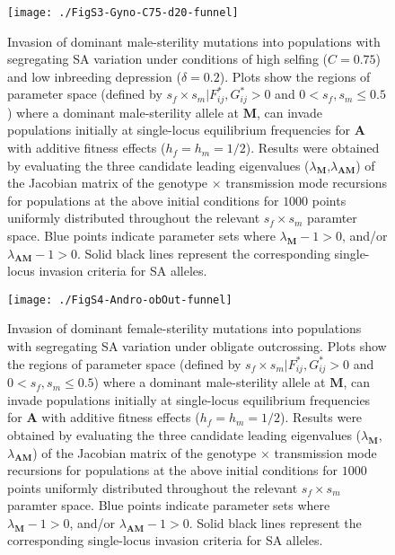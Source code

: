 \documentclass{article}
\begin{document}
\begin{figure}[ht!]
\centering
\texttt{[image: ./FigS3-Gyno-C75-d20-funnel]}
\caption{Invasion of dominant male-sterility mutations into populations with segregating SA variation under conditions of high selfing ($C = 0.75$) and low inbreeding depression ($\delta = 0.2$). Plots show the regions of parameter space (defined by $s_f \times s_m | F^{\ast}_{ij},G^{\ast}_{ij} > 0$ and $0 < s_f,s_m \leq 0.5$) where a dominant male-sterility allele at $\mathbf{M}$, can invade populations initially at single-locus equilibrium frequencies for $\mathbf{A}$ with additive fitness effects ($h_f=h_m=1/2$). Results were obtained by evaluating the three candidate leading eigenvalues ($\lambda_{\mathbf{M}}$,$\lambda_{\mathbf{AM}}$) of the Jacobian matrix of the genotype $\times$ transmission mode recursions for populations at the above initial conditions for $1000$ points uniformly distributed throughout the relevant $s_f \times s_m$ paramter space. Blue points indicate parameter sets where $\lambda_{\mathbf{M}} - 1 > 0$, and/or $\lambda_{\mathbf{AM}} - 1 > 0$. Solid black lines represent the corresponding single-locus invasion criteria for SA alleles.}
\label{fig:GynC75d20Funnel}
\end{figure}
\newpage{}

\begin{figure}[ht!]
\centering
\texttt{[image: ./FigS4-Andro-obOut-funnel]}
\caption{Invasion of dominant female-sterility mutations into populations with segregating SA variation under obligate outcrossing. Plots show the regions of parameter space (defined by $s_f \times s_m | F^{\ast}_{ij},G^{\ast}_{ij} > 0$ and $0 < s_f,s_m \leq 0.5$) where a dominant male-sterility allele at $\mathbf{M}$, can invade populations initially at single-locus equilibrium frequencies for $\mathbf{A}$ with additive fitness effects ($h_f=h_m=1/2$). Results were obtained by evaluating the three candidate leading eigenvalues ($\lambda_{\mathbf{M}}$,$\lambda_{\mathbf{AM}}$) of the Jacobian matrix of the genotype $\times$ transmission mode recursions for populations at the above initial conditions for $1000$ points uniformly distributed throughout the relevant $s_f \times s_m$ paramter space. Blue points indicate parameter sets where $\lambda_{\mathbf{M}} - 1 > 0$, and/or $\lambda_{\mathbf{AM}} - 1 > 0$. Solid black lines represent the corresponding single-locus invasion criteria for SA alleles.}
\label{fig:AndroObOutFunnel}
\end{figure}
\newpage{}
\end{document}
